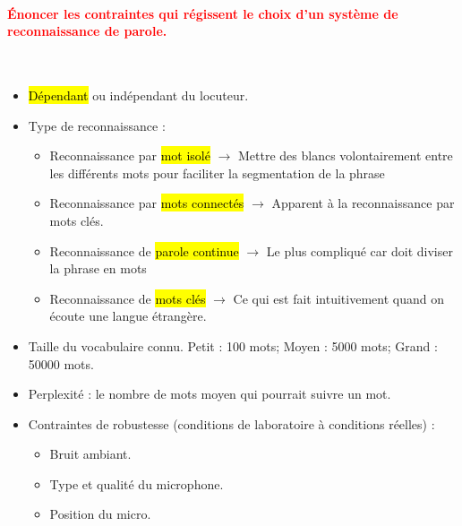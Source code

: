 \documentclass[letterpaper, 12pt]{article}
\newcommand{\red}[1]{
	\textcolor{red}{#1}
}
\begin{document}
		\paragraph{\red{Énoncer les contraintes qui régissent le choix d'un système de reconnaissance de parole.}}
		~\\
			\begin{itemize}
				\setlength{\itemsep}{0pt}		
				\setlength{\parskip}{0pt}		
				\setlength{\parsep}{0pt}	
				\item \hl{D\'ependant} ou ind\'ependant du locuteur.
				\item Type de reconnaissance : 
					\begin{itemize}
						\setlength{\itemsep}{0pt}		
						\setlength{\parskip}{0pt}		
						\setlength{\parsep}{0pt}	
						\item Reconnaissance par \hl{mot isol\'e} $\rightarrow$ Mettre des blancs volontairement 
							entre les différents mots pour faciliter la segmentation de la phrase
						\item Reconnaissance par \hl{mots connect\'es} $\rightarrow$ Apparent à la reconnaissance
							par mots clés.
						\item Reconnaissance de \hl{parole continue} $\rightarrow$ Le plus compliqué car doit 
							diviser la phrase en mots
						\item Reconnaissance de \hl{mots cl\'es} $\rightarrow$ Ce qui est fait intuitivement quand on 
							écoute une langue étrangère.
					\end{itemize}
				\item Taille du vocabulaire connu. Petit : 100 mots; Moyen : 5000 mots; Grand : 50000 mots.
				\item Perplexité : le nombre de mots moyen qui pourrait suivre un mot.
				\item Contraintes de robustesse (conditions de laboratoire à conditions réelles) : 
					\begin{itemize}
						\setlength{\itemsep}{0pt}		
						\setlength{\parskip}{0pt}		
						\setlength{\parsep}{0pt}	
						\item Bruit ambiant. 
						\item Type et qualité du microphone.
						\item Position du micro.
					\end{itemize}
			\end{itemize}
\end{document}
